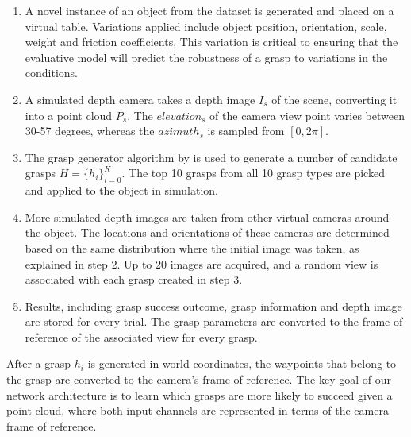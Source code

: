 \begin{enumerate}
\item A novel instance of an object from the dataset is generated and placed on a virtual table. Variations applied include object position, orientation, scale, weight and friction coefficients. This variation is critical to ensuring that the evaluative model will predict the robustness of a grasp to variations in the conditions.
\item A simulated depth camera takes a depth image $I_s$ of the scene, converting it into a point cloud $P_s$. The ${elevation}_s$ of the camera view point varies between 30-57 degrees, whereas the ${azimuth}_s$ is sampled from $[0, 2\pi]$. 
\item The grasp generator algorithm by \citet{kopicki2015ijrr} is used to generate a number of candidate grasps $H = \{h_i\}_{i=0}^{K}$. The top 10 grasps from all 10 grasp types are picked and applied to the object in simulation.
\item More simulated depth images are taken from other virtual cameras around the object. The locations and orientations of these cameras are determined based on the same distribution where the initial image was taken, as explained in step 2. Up to 20 images are acquired, and a random view is associated with each grasp created in step 3. 
\item Results, including grasp success outcome, grasp information and depth image are stored for every trial. The grasp parameters are converted to the frame of reference of the associated view for every grasp.
\end{enumerate}


After a grasp $h_i$ is generated in world coordinates, the waypoints that belong to the grasp are converted to the camera's frame of reference. The key goal of our network architecture is to learn which grasps are more likely to succeed given a point cloud, where both input channels are represented in terms of the camera frame of reference. %

